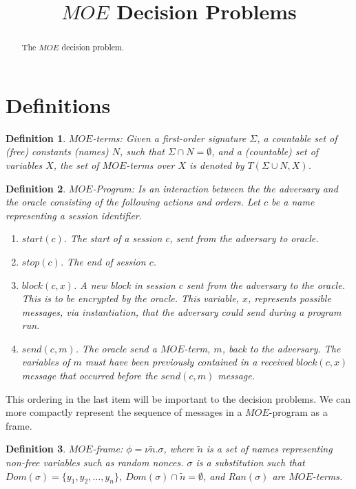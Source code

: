 \documentclass[11pt,twoside,a4paper]{article}
\title{ $MOE$ Decision Problems}
\newtheorem{definition}{Definition}
\begin{document}
\tableofcontents
\maketitle
\begin{abstract}
The $MOE$ decision problem. 

\end{abstract}


\pagebreak


\section{Definitions}

\begin{definition}
	$MOE$-terms: Given a first-order signature $\Sigma$, a countable set of (free) constants (names) $N$, such that $\Sigma \cap N =\emptyset$, and a (countable) set of variables $X$, the set of $MOE$-terms over $X$ is denoted by $T(\Sigma \cup N,X)$. 
\end{definition}



\begin{definition}
	$MOE$-Program: Is an interaction between the 
	the adversary and the oracle consisting of the following actions
	and orders. Let $c$ be a name representing a session identifier.
	\begin{enumerate}
		\item $start(c)$. The start of a session $c$, sent from the
		adversary to oracle.
		\item $stop(c)$. The end of session $c$.
		\item $block(c, x)$. A new block in session $c$ sent from
		the adversary to the oracle. This is to be encrypted by the 
		oracle. This variable, $x$, represents possible messages, via
		instantiation, that the adversary could send during a program
		run. 
		\item $send(c, m)$. The oracle send a $MOE$-term, $m$, back
		to the adversary. The variables of $m$ must have been 
		previously contained in a received $block(c, x)$ message
		that occurred before the $send(c, m)$ message.
	\end{enumerate} 
\end{definition}
This ordering in the last item will be important to the decision 
problems. We can more compactly represent the sequence of messages
in a $MOE$-program as a frame. 

\begin{definition}
		$MOE$-frame:  $\phi = \nu \tilde{n}.\sigma$, where
		$\tilde{n}$ is a set of names representing non-free variables such as random nonces. $\sigma$ is a substitution
		such that $Dom(\sigma) = \{ y_1, y_2, \ldots, y_n\}$,
		$Dom(\sigma) \cap \tilde{n} = \emptyset$, and
		$Ran(\sigma)$ are $MOE$-terms.  
\end{definition}
\end{document}

